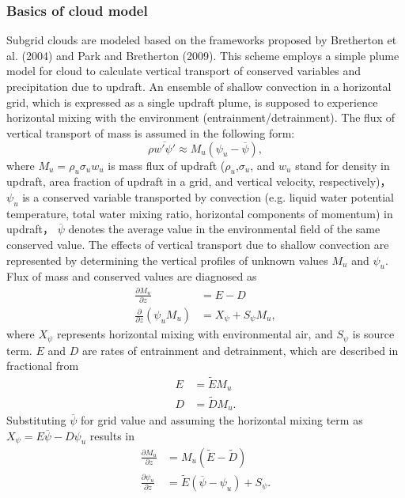 \subsubsection{Basics of cloud model}\label{basics-of-cloud-model}
Subgrid clouds are modeled based on the frameworks proposed by Bretherton et al. (2004) and Park and Bretherton (2009).
This scheme employs a simple plume model for cloud to calculate vertical transport of conserved variables and precipitation due to updraft.
An ensemble of shallow convection in a horizontal grid, which is expressed as a single updraft plume, is supposed to experience horizontal mixing with the environment
(entrainment/detrainment). The flux of vertical transport of mass is assumed in the following form:
\begin{equation}\label{def_Mu}
    \rho \overline {w' \psi '}\approx M_u (\psi_u-\overline{\psi}) ,
\end{equation}
where $M_u=\rho_u\sigma_u w_u$ is mass flux of updraft ($\rho_u$,$\sigma_u$, and $w_u$ stand for density in updraft, area fraction of updraft in a grid, and vertical velocity, respectively)，
$\psi_u$ is a conserved variable transported by convection (e.g. liquid water potential temperature, total water mixing ratio, horizontal components of momentum) in updraft，
$\overline{\psi}$ denotes the average value in the environmental field of the same conserved value.
The effects of vertical transport due to shallow convection are represented by determining the vertical profiles of unknown values $M_u$ and $\psi_u$.
Flux of mass and conserved values are diagnosed as
\begin{align}
    \frac{\partial M_u}{\partial z} &= E - D \label{zprof_Mu}\\
    \frac{\partial}{\partial z} (\psi_u M_u) &= X_\psi + S_\psi M_u,\label{zprof_psi}
\end{align}
where $X_\psi$ represents horizontal mixing with environmental air, and $S_\psi$ is source term. $E$ and $D$ are rates of entrainment and detrainment, which are described in fractional from
\begin{align}
    E &=\tilde{E}M_u \label{fracE}\\
    D &=\tilde{D} M_u. \label{fracD}
\end{align}
Substituting $\overline{\psi}$ for grid value and assuming the horizontal mixing term as $X_{\psi}=E \overline{\psi} - D\psi_u$ results in
\begin{align}
    \frac{\partial M_u}{\partial z} &= M_u (\tilde{E} - \tilde{D}) \label{zprof_Mu'}\\
    \frac{\partial \psi_u}{\partial z} &= \tilde{E}(\overline{\psi} - \psi_u) + S_{\psi}. \label{zprof_psi'}
\end{align}
